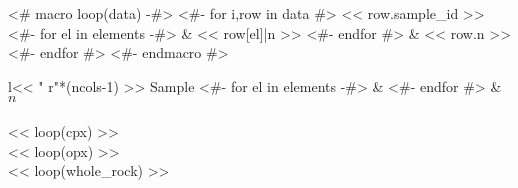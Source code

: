 <# macro loop(data) -#>
  <#- for i,row in data #>
    << row.sample_id >>
    <#- for el in elements -#>
    & << row[el]|n >>
    <#- endfor #> & << row.n >> \\
  <#- endfor #>
<#- endmacro #>
\begin{tabular}{l<< " r"*(ncols-1) >>}
\hline
  Sample
  <#- for el in elements -#>
  & 
  <#- endfor #> & $n$ \\
\hline
{} \\
\hline
<< loop(cpx) >>
\hline
{} \\
\hline
<< loop(opx) >>
\hline
{} \\
\hline
<< loop(whole_rock) >>
\hline
\end{tabular}



